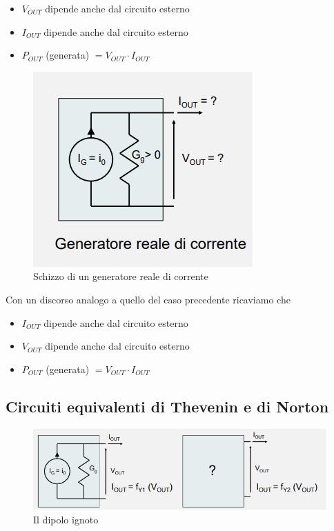 \documentclass{article}
\begin{document}
\begin{itemize}
  \item $V_{OUT}$ dipende anche dal circuito esterno
  \item $I_{OUT}$ dipende anche dal circuito esterno
  \item $P_{OUT}$ (generata) $= V_{OUT} \cdot I_{OUT}$
\end{itemize}

\begin{figure}[h]
  \centering
  \includegraphics[scale=0.5]{IM_generatori_reali_corrente}
  \caption{Schizzo di un generatore reale di corrente}
  \label{Schema_generatore_reale_corrente}
\end{figure}

Con un discorso analogo a quello del caso precedente ricaviamo che

\begin{itemize}
  \item $I_{OUT}$ dipende anche dal circuito esterno
  \item $V_{OUT}$ dipende anche dal circuito esterno
  \item $P_{OUT}$ (generata) $= V_{OUT} \cdot I_{OUT}$
\end{itemize}

\clearpage












\subsection{Circuiti equivalenti di Thevenin e di Norton}

\begin{figure}[h]
  \centering
  \includegraphics[scale=0.7]{IM_Thevenin_Norton}
  \caption{Il dipolo ignoto}
  \label{Schema_Thevenin_Norton}
\end{figure}
\end{document}
